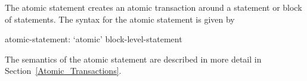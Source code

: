 The atomic statement creates an atomic transaction around a statement
or block of statements.  The syntax for the atomic statement is given
by
\begin{syntax}
atomic-statement:
  `atomic' block-level-statement
\end{syntax}

The semantics of the atomic statement are described in more detail in
Section~\ref{Atomic_Transactions}.
